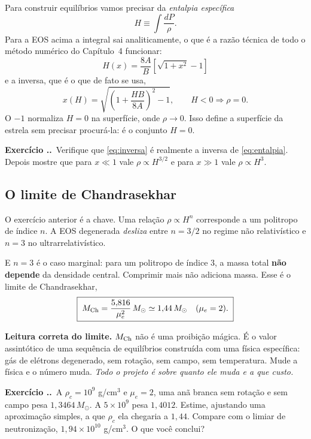 \documentclass[11pt,a4paper]{article}
\newcommand{\Msun}{M_\odot}
\newcommand{\Mch}{M_{\rm Ch}}
\newcounter{exerc}[section]
\newcommand{\ex}[1]{\refstepcounter{exerc}%
  \medskip\noindent\textbf{Exercício \thesection.\theexerc.}\ #1\medskip}
\begin{document}
Para construir equilíbrios vamos precisar da \emph{entalpia específica}
\begin{equation}
H \equiv \int \frac{dP}{\rho} .
\end{equation}
Para a EOS acima a integral sai analiticamente, o que é a razão técnica de todo
o método numérico do Capítulo~4 funcionar:
\begin{equation}
\boxed{\;H(x) = \frac{8A}{B}\left[\sqrt{1+x^2} - 1\right]\;}
\label{eq:entalpia}
\end{equation}
e a inversa, que é o que de fato se usa,
\begin{equation}
x(H) = \sqrt{\left(1 + \frac{HB}{8A}\right)^2 - 1},
\qquad H<0 \Rightarrow \rho = 0 .
\label{eq:inversa}
\end{equation}
O $-1$ normaliza $H=0$ na superfície, onde $\rho \to 0$. Isso define a
superfície da estrela sem precisar procurá-la: é o conjunto $H = 0$.

\ex{Verifique que \eqref{eq:inversa} é realmente a inversa de
\eqref{eq:entalpia}. Depois mostre que para $x \ll 1$ vale
$\rho \propto H^{3/2}$ e para $x \gg 1$ vale $\rho \propto H^{3}$.}

\subsection{O limite de Chandrasekhar}

O exercício anterior é a chave. Uma relação $\rho \propto H^{n}$ corresponde a
um politropo de índice $n$. A EOS degenerada \emph{desliza} entre $n=3/2$ no
regime não relativístico e $n=3$ no ultrarrelativístico.

E $n=3$ é o caso marginal: para um politropo de índice $3$, a massa total
\textbf{não depende} da densidade central. Comprimir mais não adiciona massa.
Esse é o limite de Chandrasekhar,
\begin{equation}
\boxed{\;\Mch = \frac{5{,}816}{\mu_e^2}\,\Msun \simeq 1{,}44\,\Msun
\quad (\mu_e = 2).\;}
\end{equation}

\begin{alerta}
\textbf{Leitura correta do limite.} $\Mch$ não é uma proibição mágica. É o
valor assintótico de uma sequência de equilíbrios construída com uma física
específica: gás de elétrons degenerado, sem rotação, sem campo, sem
temperatura. Mude a física e o número muda. \emph{Todo o projeto é sobre
quanto ele muda e a que custo.}
\end{alerta}

\ex{A $\rho_c = 10^9$ g/cm$^3$ e $\mu_e=2$, uma anã branca sem rotação e sem
campo pesa $1{,}3464\,\Msun$. A $5\times10^9$ pesa $1{,}4012$. Estime, ajustando
uma aproximação simples, a que $\rho_c$ ela chegaria a $1{,}44$. Compare com o
limiar de neutronização, $1{,}94\times10^{10}$ g/cm$^3$. O que você conclui?}
\end{document}
